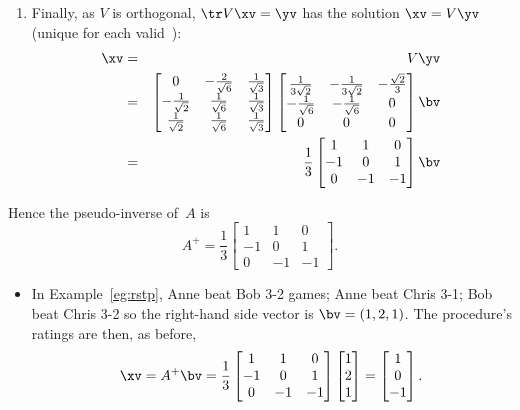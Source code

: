\begin{example}
\begin{solution}
\begin{enumerate}
\item Finally, as \(V\) is orthogonal, \(\tr V\xv=\yv\) has the solution \(\xv=V\yv\) (unique for each valid~\yv):
\begin{eqnarray*}
\xv&=&V\yv
\\&=&\begin{bmatrix} 0&-\frac2{\sqrt6}&\frac1{\sqrt3}
\\-\frac1{\sqrt2}&\frac1{\sqrt6}&\frac1{\sqrt3}
\\\frac1{\sqrt2}&\frac1{\sqrt6}&\frac1{\sqrt3} \end{bmatrix}
\begin{bmatrix} \frac1{3\sqrt2}&-\frac1{3\sqrt2}&-\frac{\sqrt2}3 
\\-\frac1{\sqrt6}&-\frac1{\sqrt6}&0
\\0&0&0 \end{bmatrix}\bv
\\&=&\frac13\begin{bmatrix} 1&1&0
\\-1&0&1
\\0& -1&-1 \end{bmatrix}\bv
\end{eqnarray*}
\end{enumerate}
Hence the pseudo-inverse of~\(A\) is
\begin{equation*}
A^+=\frac13\begin{bmatrix} 1&1&0
\\-1&0&1
\\0& -1&-1 \end{bmatrix}.
\end{equation*}
\begin{itemize}
\item In Example~\ref{eg:rstp}, Anne beat Bob
3-2 games; Anne beat Chris 3-1; Bob beat Chris 3-2 so the right-hand side vector is \(\bv=(1,2,1)\).
The procedure's ratings are then, as before, 
\begin{equation*}
\xv=A^+\bv=\frac13\begin{bmatrix} 1&1&0
\\-1&0&1
\\0& -1&-1 \end{bmatrix}\begin{bmatrix} 1\\2\\1 \end{bmatrix}
=\begin{bmatrix} 1\\0\\-1 \end{bmatrix}.
\end{equation*}


\end{itemize}
\end{solution}
\end{example}
